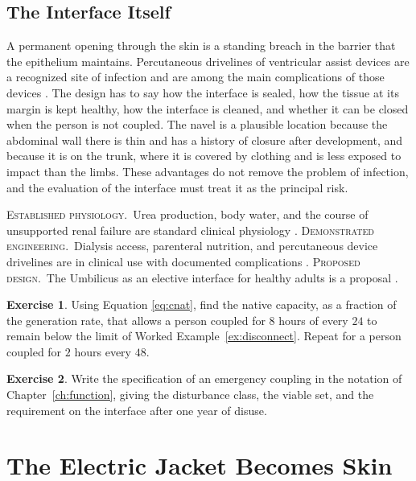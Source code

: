 \documentclass[11pt,openany]{book}
\theoremstyle{definition}
\newtheorem{exercise}{Exercise}[chapter]
\theoremstyle{remark}
\newcommand{\est}{\textsc{Established physiology.}\ }
\newcommand{\dem}{\textsc{Demonstrated engineering.}\ }
\newcommand{\pro}{\textsc{Proposed design.}\ }
\begin{document}
\section{The Interface Itself}

A permanent opening through the skin is a standing breach in the barrier that the epithelium maintains. Percutaneous drivelines of ventricular assist devices are a recognized site of infection and are among the main complications of those devices \cite{mehra2017}. The design has to say how the interface is sealed, how the tissue at its margin is kept healthy, how the interface is cleaned, and whether it can be closed when the person is not coupled. The navel is a plausible location because the abdominal wall there is thin and has a history of closure after development, and because it is on the trunk, where it is covered by clothing and is less exposed to impact than the limbs. These advantages do not remove the problem of infection, and the evaluation of the interface must treat it as the principal risk.

\begin{evidence}
\est Urea production, body water, and the course of unsupported renal failure are standard clinical physiology \cite{boron2017,guyton2021}. \dem Dialysis access, parenteral nutrition, and percutaneous device drivelines are in clinical use with documented complications \cite{mehra2017,gura2016}. \pro The Umbilicus as an elective interface for healthy adults is a proposal \cite{flyxion2026cm}.
\end{evidence}

\begin{exercise}
Using Equation \eqref{eq:cnat}, find the native capacity, as a fraction of the generation rate, that allows a person coupled for $8$ hours of every $24$ to remain below the limit of Worked Example~\ref{ex:disconnect}. Repeat for a person coupled for $2$ hours every $48$.
\end{exercise}

\begin{exercise}
Write the specification of an emergency coupling in the notation of Chapter~\ref{ch:function}, giving the disturbance class, the viable set, and the requirement on the interface after one year of disuse.
\end{exercise}

\chapter{The Electric Jacket Becomes Skin}
\label{ch:jacket}
\end{document}
